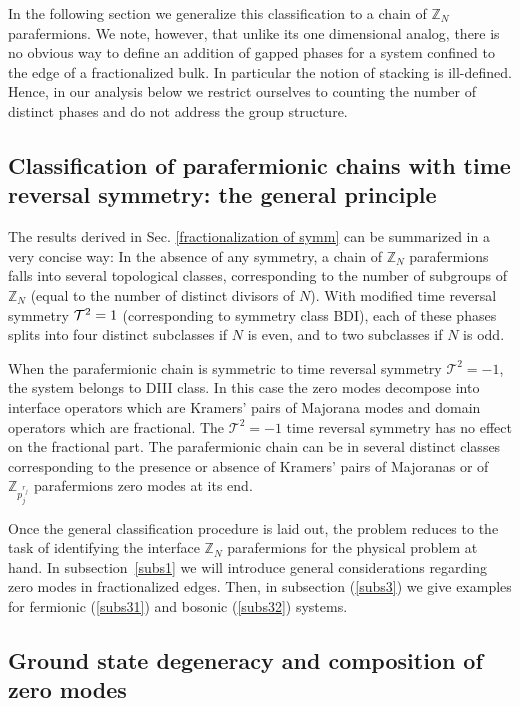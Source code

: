\documentclass[twocolumn,aps,prb,showpacs]{revtex4-1}
\begin{document}
In the following section we generalize this classification to a chain of $\mathbb{Z}_N$ parafermions. We note, however, that unlike its  one dimensional analog, there is no obvious way to define an addition of gapped phases for a system  confined to the edge of a fractionalized bulk. In particular the notion of stacking is  ill-defined. Hence, in our analysis  below we restrict ourselves to counting the number of distinct phases and do not address the group structure.

\subsection{Classification of parafermionic chains with time reversal symmetry: the general principle}
The results derived in Sec. \ref{fractionalization of symm} can be summarized in a very concise way:  In the absence of any symmetry, a chain of $\mathbb{Z}_N $ parafermions falls into several topological classes, corresponding to the number of subgroups of $\mathbb{Z}_N$ (equal to the number of distinct divisors of $N$).
With modified time reversal symmetry ${\cal T}^2=1$ (corresponding to symmetry class BDI), each of these phases splits into four distinct subclasses if $N $ is even, and to two subclasses if $N $ is odd.

When the parafermionic chain is symmetric to time reversal symmetry $\mathcal{T}^2=-1 $, the system  belongs to DIII class. In this case the zero modes decompose into interface operators which are Kramers' pairs of Majorana modes and domain operators which are fractional. The  $\mathcal{T}^2=-1 $ time reversal symmetry has no effect on the fractional part. The parafermionic chain can be in several distinct classes corresponding to the presence or absence of  Kramers' pairs of Majoranas or of $\mathbb{Z}_{p_j^{r_j}} $ parafermions zero modes at its end.


Once the  general classification procedure is laid out, the problem reduces to the task of identifying  the interface $\mathbb{Z}_N$ parafermions for the physical problem at hand. In subsection~\ref{subs1}  we will introduce general considerations regarding zero modes in fractionalized edges. Then, in subsection (\ref{subs3}) we give examples for fermionic (\ref{subs31}) and bosonic (\ref{subs32}) systems.




\subsection{Ground state degeneracy and composition of zero modes \label{subs1}}
\end{document}
